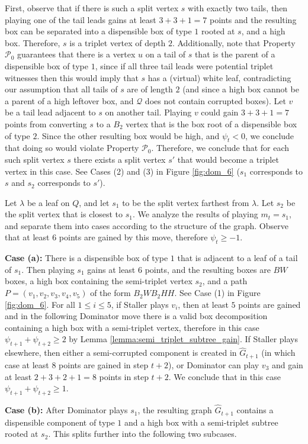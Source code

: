 \documentclass[11pt]{article}
\theoremstyle{definition}
\def\propt1{\mathcal{P}_0}
\begin{document}
First, observe that if there is such a split vertex $s$ with exactly two tails, then playing one of the tail leads gains at least $3 + 3 + 1 = 7$ points and the resulting box can be separated into a dispensible box of type $1$ rooted at $s$, and a high box.
Therefore, $s$ is a triplet vertex of depth $2$.
Additionally, note that Property $\propt1$ guarantees that there is a vertex $u$ on a tail of $s$ that is the parent of a dispensible box of type $1$, since if all three tail leads were potential triplet witnesses then this would imply that $s$ has a (virtual) white leaf, contradicting our assumption that all tails of $s$ are of length $2$ 
(and since a high box cannot be a parent of a high leftover box, and $\mathcal{Q}$ does not contain corrupted boxes). 
Let $v$ be a tail lead adjacent to $s$ on another tail. Playing $v$
could gain $3 + 3 + 1 = 7$ points from converting $s$ to a $B_2$ vertex that is the box root of a dispensible box of type $2$.
Since the other resulting box would be high, and $\psi_t < 0$, we conclude that doing so would violate Property $\propt1$.
Therefore, we conclude that for each such split vertex $s$ there exists a split vertex $s'$ that would become a triplet vertex in this case. 
See Cases (2) and (3) in Figure \ref{fig:dom_6} ($s_1$ corresponds to $s$ and $s_2$ corresponds to $s'$).

Let $\lambda$ be a leaf on $Q$, 
and let $s_1$ to be the split vertex farthest from $\lambda$.
Let $s_2$ be the split vertex that is closest to $s_1$.
We analyze the results of playing $m_t = s_1$, and separate them into cases according to the structure of the graph.
Observe that at least $6$ points are gained by this move, therefore $\psi_t \geq -1$.

\bigskip
\par\noindent
{\bf Case (a):}
There is a dispensible box of type $1$ that is adjacent to a leaf of a tail of $s_1$.
Then playing $s_1$ gains at least $6$ points, and the resulting boxes are $BW$ boxes, a high box containing the semi-triplet vertex $s_2$, and a path $P = (v_1, v_2, v_3, v_4, v_5)$ of the form $B_2WB_2HH$. 
See Case (1) in Figure \ref{fig:dom_6}.
For all $1 \leq i \leq 5$, 
if Staller plays $v_i$, then at least $5$ points are gained 
and in the following Dominator move there is a valid box decomposition containing a high box with a semi-triplet vertex, therefore in this case $\psi_{t+1} + \psi_{t+2} \geq 2$ by Lemma \ref{lemma:semi_triplet_subtree_gain}. 
If Staller plays elsewhere, 
then either a semi-corrupted component is created in $\hat{G}_{t+1}$ (in which case at least $8$ points are gained in step $t+2$), 
or Dominator can play $v_3$ and gain at least $2 + 3 + 2 + 1 = 8$ points in step $t+2$.
We conclude that in this case $\psi_{t+1} + \psi_{t+2} \geq 1$. 	
\bigskip
\par\noindent
{\bf Case (b):}
After Dominator plays $s_1$, the resulting graph $\hat{G}_{t+1}$ contains 
a dispensible component of type $1$ and a high box with a semi-triplet subtree rooted at $s_2$. This splits further into the following two subcases.
\end{document}
